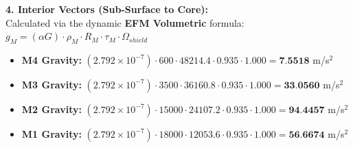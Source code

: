 \documentclass[11pt, a4paper]{article}
\begin{document}
  \vspace{0.5em}
  \noindent \textbf{4. Interior Vectors (Sub-Surface to Core):} \\[0.5em]
  \hspace*{1em} Calculated via the dynamic \textbf{EFM Volumetric} formula: $g_M = (\alpha G) \cdot \rho_{M} \cdot R_M \cdot \tau_M \cdot \Omega_{shield}$
  \begin{itemize}
    \item \textbf{M4 Gravity:} $(2.792 \times 10^{-7}) \cdot 600 \cdot 48214.4 \cdot 0.935 \cdot 1.000 = \textbf{7.5518}$ m/s$^2$
    \item \textbf{M3 Gravity:} $(2.792 \times 10^{-7}) \cdot 3500 \cdot 36160.8 \cdot 0.935 \cdot 1.000 = \textbf{33.0560}$ m/s$^2$
    \item \textbf{M2 Gravity:} $(2.792 \times 10^{-7}) \cdot 15000 \cdot 24107.2 \cdot 0.935 \cdot 1.000 = \textbf{94.4457}$ m/s$^2$
    \item \textbf{M1 Gravity:} $(2.792 \times 10^{-7}) \cdot 18000 \cdot 12053.6 \cdot 0.935 \cdot 1.000 = \textbf{56.6674}$ m/s$^2$
  \end{itemize}
\end{document}
